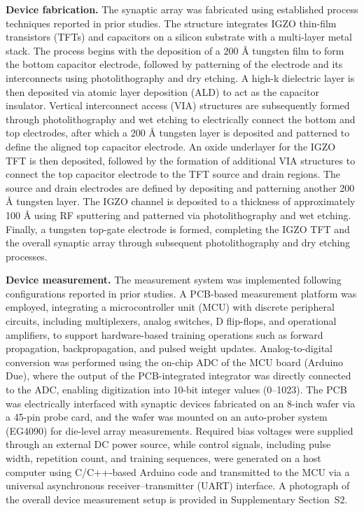 \documentclass[fleqn,10pt]{wlscirep}
\begin{document}
\noindent\textbf{Device fabrication.}
The synaptic array was fabricated using established process techniques reported in prior studies\cite{won2023advs_6t1c, kang2025advs_disturbance}. The structure integrates IGZO thin-film transistors (TFTs) and capacitors on a silicon substrate with a multi-layer metal stack. The process begins with the deposition of a 200 Å tungsten film to form the bottom capacitor electrode, followed by patterning of the electrode and its interconnects using photolithography and dry etching. A high-k dielectric layer is then deposited via atomic layer deposition (ALD) to act as the capacitor insulator. Vertical interconnect access (VIA) structures are subsequently formed through photolithography and wet etching to electrically connect the bottom and top electrodes, after which a 200 Å tungsten layer is deposited and patterned to define the aligned top capacitor electrode. An oxide underlayer for the IGZO TFT is then deposited, followed by the formation of additional VIA structures to connect the top capacitor electrode to the TFT source and drain regions. The source and drain electrodes are defined by depositing and patterning another 200 Å tungsten layer. The IGZO channel is deposited to a thickness of approximately 100 Å using RF sputtering and patterned via photolithography and wet etching. Finally, a tungsten top-gate electrode is formed, completing the IGZO TFT and the overall synaptic array through subsequent photolithography and dry etching processes.

\noindent\textbf{Device measurement.}
The measurement system was implemented following configurations reported in prior studies\cite{won2023advs_6t1c, kang2025advs_disturbance}. A PCB-based measurement platform was employed, integrating a microcontroller unit (MCU) with discrete peripheral circuits, including multiplexers, analog switches, D flip-flops, and operational amplifiers, to support hardware-based training operations such as forward propagation, backpropagation, and pulsed weight updates. Analog-to-digital conversion was performed using the on-chip ADC of the MCU board (Arduino Due), where the output of the PCB-integrated integrator was directly connected to the ADC, enabling digitization into 10-bit integer values (0–1023). The PCB was electrically interfaced with synaptic devices fabricated on an 8-inch wafer via a 45-pin probe card, and the wafer was mounted on an auto-prober system (EG4090) for die-level array measurements. Required bias voltages were supplied through an external DC power source, while control signals, including pulse width, repetition count, and training sequences, were generated on a host computer using C/C++-based Arduino code and transmitted to the MCU via a universal asynchronous receiver–transmitter (UART) interface. A photograph of the overall device measurement setup is provided in Supplementary Section~S2.
\end{document}
